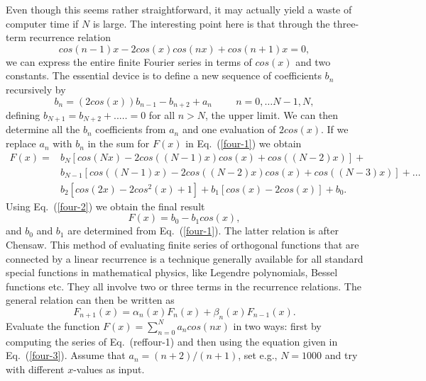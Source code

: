 \begin{prob}
Even though this seems rather straightforward, it may
actually yield a waste of computer time if $N$ is large.
The interesting point here is that through the three-term
recurrence relation
%
\begin{equation}
cos(n-1)x-2cos(x)cos(nx)+cos(n+1)x=0,
\label{four-2}
\end{equation}
%
we can express the entire finite Fourier series in terms
of $cos(x)$ and two constants. The essential device is
to define a new sequence of coefficients 
$b_n$ recursively by
%
\begin{equation}
b_n=(2cos(x))b_{n-1}-b_{n+2}+a_n \hspace{1cm} n=0,\dots N-1, N,
\label{four-3}
\end{equation}
%
defining $b_{N+1}=b_{N+2}+..\dots=0$ for all $n>N$, the upper limit.
We can then determine all the $b_n$ coefficients from $a_n$ and one evaluation
of $2cos(x)$. If we replace $a_n$ with $b_n$ in the sum for $F(x)$ 
in Eq.~(\ref{four-1}) we obtain 
%
\begin{eqnarray}
    F(x)=&b_N\left[cos(Nx)-2cos((N-1)x)cos(x)+cos((N-2)x)\right]  + \nonumber\\
       &b_{N-1}\left[cos((N-1)x)-2cos((N-2)x)cos(x)+cos((N-3)x)\right]  +\dots \nonumber\\
   &b_2\left[cos(2x)-2cos^2(x)+1\right]  + b_1\left[cos(x)-2cos(x)\right]+b_0.
\end{eqnarray}  
%
Using Eq.~(\ref{four-2}) we obtain the final result
\begin{equation}
    F(x)=b_0-b_1cos(x),
 \label{four-4}
\end{equation}
%
and $b_0$ and $b_1$ are determined from Eq.~(\ref{four-1}). 
The latter relation is after Chensaw. 
This method of evaluating finite series of orthogonal functions that are connected by a linear recurrence is a technique generally available for all standard
special functions in mathematical physics, like Legendre polynomials,
Bessel functions etc. They all involve two or three terms in the recurrence
relations. The general relation can then be written as 
\[
   F_{n+1}(x)=\alpha_n(x)F_n(x)+\beta_n(x)F_{n-1}(x).
\]
Evaluate the function $F(x)=\sum_{n=0}^{N}a_n cos(nx)$
in two ways: first by computing the series of Eq.~(ref{four-1})
and then using the equation given in Eq.~(\ref{four-3}).
Assume that $a_n=(n+2)/(n+1)$, set e.g., $N=1000$ and try with different
$x$-values as input.
\end{prob}



